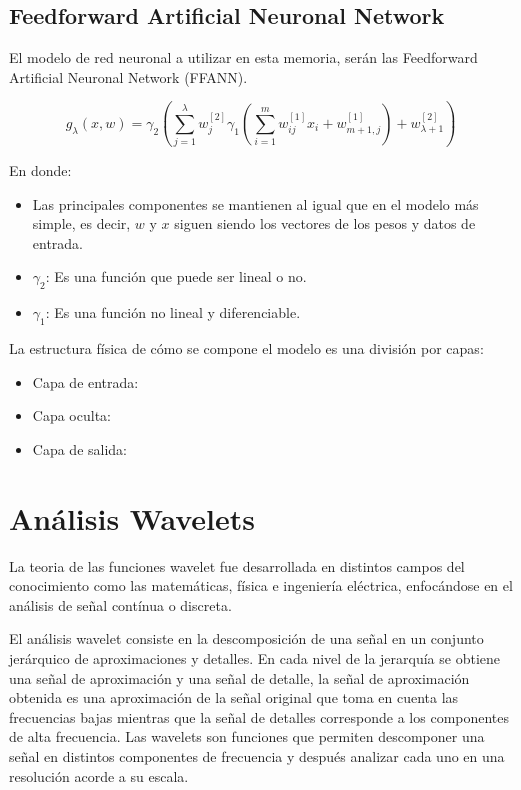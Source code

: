 \subsection{Feedforward Artificial Neuronal Network}

El modelo de red neuronal a utilizar en esta memoria, serán las Feedforward
Artificial Neuronal Network (FFANN).

$$ g_{\lambda}(x,w) = \gamma_2 \left( \sum_{j = 1}^{\lambda} w_j^{[2]} \gamma_1 
\left( \sum_{i = 1}^{m} w_{ij}^{[1]}x_i + w_{m+1,j}^{[1]} \right) + 
w_{\lambda+1}^{[2]} \right) $$

En donde:
\begin{itemize}
	\item Las principales componentes se mantienen al igual que en el modelo más 
simple, es decir, $w$ y $x$ siguen siendo los vectores de los pesos y datos de entrada.
	\item $\gamma_2$: Es una función que puede ser lineal o no.
	\item $\gamma_1$: Es una función no lineal y diferenciable.
\end{itemize}

La estructura física de cómo se compone el modelo es una división por capas:
\begin{itemize}
	\item Capa de entrada:
	\item Capa oculta:
	\item Capa de salida:
\end{itemize}

\section{Análisis Wavelets}
La teoria de las funciones wavelet fue desarrollada en distintos campos del
conocimiento como las matemáticas, física e ingeniería eléctrica, enfocándose
en el análisis de señal contínua o discreta.

El análisis wavelet consiste en la descomposición de una señal en un conjunto
jerárquico de aproximaciones y detalles. En cada nivel de la jerarquía se
obtiene una señal de aproximación y una señal de detalle, la señal de
aproximación obtenida es una aproximación de la señal original que toma en
cuenta las frecuencias bajas mientras que la señal de detalles corresponde a
los componentes de alta frecuencia. Las wavelets son funciones que permiten
descomponer una señal en distintos componentes de frecuencia y después analizar
cada uno en una resolución acorde a su escala.

